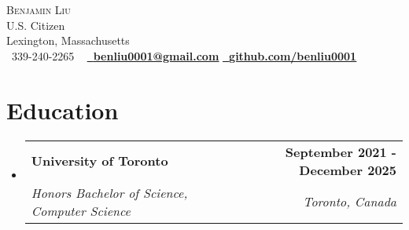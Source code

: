 \documentclass[letterpaper,11pt]{article}
\makeatletter
\let\oldhref\href
\renewcommand{\href}[2]{\oldhref{#1}{\bfseries#2}}
\newcommand{\resumeSubheading}[4]{
  \vspace{-2pt}\item
    \begin{tabular*}{1.0\textwidth}[t]{l@{\extracolsep{\fill}}r}
      \textbf{#1} & \textbf{\small #2} \\
      \textit{\small#3} & \textit{\small #4} \\
    \end{tabular*}\vspace{-7pt}
}
\newcommand{\resumeSubHeadingListStart}{\begin{itemize}[leftmargin=0.0in, label={}]}
\newcommand{\resumeSubHeadingListEnd}{\end{itemize}}
\makeatother
\begin{document}

\begin{center}
    {\Huge \scshape Benjamin Liu} \\ \vspace{1pt}
    U.S. Citizen \\ \vspace{1pt}
    Lexington, Massachusetts \\ \vspace{1pt}
    \small \raisebox{-0.1\height}\faPhone\ 339-240-2265 ~ \href{mailto:benliu0001@gmail.com}{\raisebox{-0.2\height}\faEnvelope\  \underline{benliu0001@gmail.com}} \href{https://github.com/benliu0001}{\raisebox{-0.2\height}\faGithub\ \underline{github.com/benliu0001}} ~ 
    \vspace{-8pt}
\end{center}


\section{Education}
  \resumeSubHeadingListStart
    \resumeSubheading
      {University of Toronto}{September 2021 - December 2025}
      {Honors Bachelor of Science, Computer Science}{Toronto, Canada}
  \resumeSubHeadingListEnd

\end{document}
